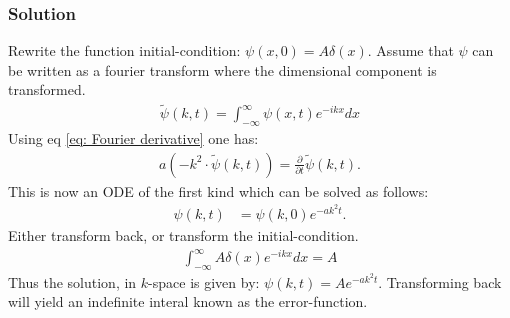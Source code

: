 \subsubsection*{Solution}
Rewrite the function initial-condition: $\psi(x,0) = A\delta(x)$. Assume that $\psi$ can be written as a fourier transform where the dimensional component is transformed.
\begin{align*}
    \tilde{\psi}(k, t) = \int_{-\infty}^\infty \psi(x,t)e^{-ik x}dx
\end{align*}Using eq \eqref{eq: Fourier derivative} one has:
\begin{align*}
    a \left(-k^2\cdot \tilde{\psi}(k, t)\right) = \frac{\partial}{\partial t}\tilde{\psi}(k, t).
\end{align*}This is now an ODE of the first kind which can be solved as follows:
\begin{align*}
    \psi(k, t) &= \psi(k, 0)e^{-a k^2 t}.
\end{align*}Either transform back, or transform the initial-condition.
\begin{align*}
    \int_{-\infty}^{\infty}A\delta(x)e^{-ikx}dx = A
\end{align*}Thus the solution, in $k$-space is given by: $\psi(k, t) = Ae^{-ak^2t}.$ Transforming back will yield an indefinite interal known as the error-function.
